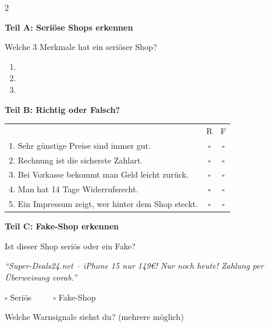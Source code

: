 \documentclass[a4paper,landscape,8pt]{extarticle}
\begin{document}
\begin{multicols}{2}

\textbf{\large Teil A: Seriöse Shops erkennen}

Welche 3 Merkmale hat ein seriöser Shop?

\vspace{2mm}

\begin{enumerate}
\item \dotfill
\item \dotfill
\item \dotfill
\end{enumerate}

\vspace{4mm}

\textbf{\large Teil B: Richtig oder Falsch?}

\vspace{2mm}

\renewcommand{\arraystretch}{1.6}
\begin{tabular}{@{}p{8cm}cc@{}}
& R & F \\
1. Sehr günstige Preise sind immer gut. & $\square$ & $\square$ \\
2. Rechnung ist die sicherste Zahlart. & $\square$ & $\square$ \\
3. Bei Vorkasse bekommt man Geld leicht zurück. & $\square$ & $\square$ \\
4. Man hat 14 Tage Widerrufsrecht. & $\square$ & $\square$ \\
5. Ein Impressum zeigt, wer hinter dem Shop steckt. & $\square$ & $\square$ \\
\end{tabular}
\renewcommand{\arraystretch}{1}

\vspace{6mm}

\textbf{\large Teil C: Fake-Shop erkennen}

Ist dieser Shop seriös oder ein Fake?

\vspace{2mm}

{\footnotesize\itshape ``Super-Deals24.net -- iPhone 15 nur 149\euro{}! Nur noch heute! Zahlung per Überweisung vorab.''}

\vspace{2mm}

$\square$ Seriös ~~~~ $\square$ Fake-Shop

\vspace{2mm}

Welche Warnsignale siehst du? (mehrere möglich)


\end{multicols}
\end{document}
